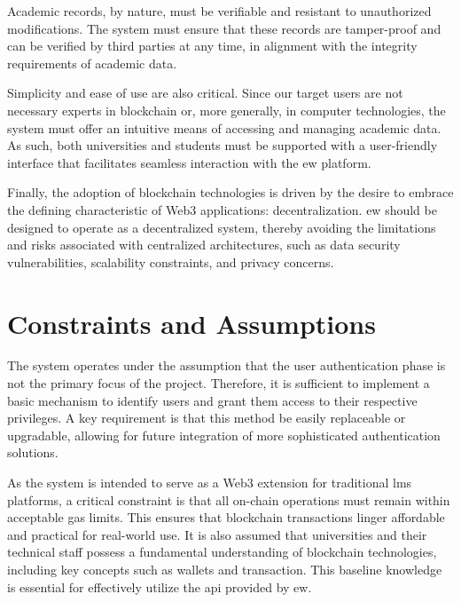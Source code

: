 Academic records, by nature, must be verifiable and resistant to unauthorized modifications. The system must ensure that these records are tamper-proof and can be verified by third parties at any time, in alignment with the integrity requirements of academic data.

Simplicity and ease of use are also critical. Since our target users are not necessary experts in blockchain or, more generally, in computer technologies, the system must offer an intuitive means of accessing and managing academic data. As such, both universities and students must be supported with a user-friendly interface that facilitates seamless interaction with the \gls{ew} platform.

Finally, the adoption of blockchain technologies is driven by the desire to embrace the defining characteristic of Web3 applications: decentralization. \gls{ew} should be designed to operate as a decentralized system, thereby avoiding the limitations and risks associated with centralized architectures, such as data security vulnerabilities, scalability constraints, and privacy concerns.



\section{Constraints and Assumptions}
The system operates under the assumption that the user authentication phase is not the primary focus of the project. Therefore, it is sufficient to implement a basic mechanism to identify users and grant them access to their respective privileges. A key requirement is that this method be easily replaceable or upgradable, allowing for future integration of more sophisticated authentication solutions.

As the system is intended to serve as a Web3 extension for traditional \gls{lms} platforms, a critical constraint is that all on-chain operations must remain within acceptable gas limits. This ensures that blockchain transactions linger affordable and practical for real-world use. It is also assumed that universities and their technical staff possess a fundamental understanding of blockchain technologies, including key concepts such as wallets and transaction. This baseline knowledge is essential for effectively utilize the \gls{api} provided by \gls{ew}.